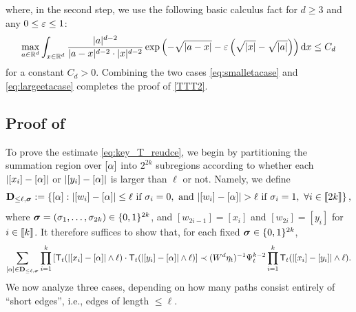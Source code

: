 where, in the second step, we use the following basic calculus fact for $d\ge 3$ and any $0\le {\varepsilon} \le 1$:
$$
\max_{a\in \mathbb R^d} \int_{x\in \mathbb R^d}\frac{|a|^{d-2}}{|a-x|^{d-2}\cdot |x|^{d-2}}\exp\left(-\sqrt{|a-x|}-{\varepsilon} \left({\sqrt{|x|}-\sqrt{|a|}}\right) \right)\mathrm{d} x\le C_d$$
for a constant $C_d>0$. Combining the two cases \eqref{eq:smalletacase} and \eqref{eq:largeetacase} completes the proof of \eqref{TTT2}. 



\subsection{Proof of }\label{pf:claim_TTk}
To prove the estimate \eqref{eq:key_T_reudce}, we begin by partitioning the summation region over $[\alpha]$ into $2^{2k}$ subregions according to whether each $|[x_i]-[\alpha]|$ or $|[y_i]-[\alpha]|$ is larger than $\ell$ or not. Namely, we define
\[ \bD_{\le \ell,\bsig}:=\left\{[\al]:  |[w_{i}]-[\al]|\le \ell \ \text{if}\ \sig_i=0, \text{ and } |[w_{i}]-[\al]|>\ell \ \text{if}\ \sig_i=1, \ \forall i\in\qqq{2k} \right\},\]
where ${\boldsymbol{\sigma}}=(\sigma_1,\ldots, \sigma_{2k}) \in \{0,1\}^{2k}$, and $[w_{2i-1}]=[x_i]$ and $[w_{2i}]=[y_i]$ for $i\in\llbracket{k}\rrbracket$. It therefore suffices to show that, for each fixed ${\boldsymbol{\sigma}} \in \{0,1\}^{2k}$,
\begin{align}\label{eq:key_T_reudce_pf}
 \sum_{[\alpha]\in {\mathbf{D}}_{\le \ell,{\boldsymbol{\sigma}}}} \prod_{i=1}^k \left[{{\mathsf T}_{t}(|[x_i]-[\alpha]|\wedge \ell) \cdot {\mathsf T}_{t}(|[y_i]-[\alpha]|\wedge \ell) }\right] \prec (W^d\eta_t)^{-1} \Psi_t^{k-2}  \prod_{i=1}^k {\mathsf T}_{t}(|[x_i]-[y_i]|\wedge \ell) .
\end{align} 
We now analyze three cases, depending on how many paths consist entirely of ``short edges'', i.e., edges of length $\le \ell$.

